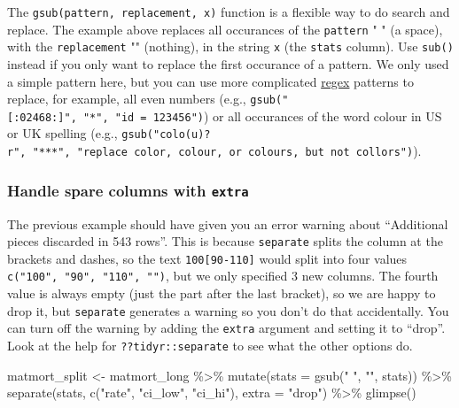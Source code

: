\documentclass[
  oneside]{book}
\newenvironment{Shaded}{\begin{snugshade}}{\end{snugshade}}
\newcommand{\AttributeTok}[1]{\textcolor[rgb]{0.77,0.63,0.00}{#1}}
\newcommand{\FunctionTok}[1]{\textcolor[rgb]{0.00,0.00,0.00}{#1}}
\newcommand{\NormalTok}[1]{#1}
\newcommand{\OtherTok}[1]{\textcolor[rgb]{0.56,0.35,0.01}{#1}}
\newcommand{\SpecialCharTok}[1]{\textcolor[rgb]{0.00,0.00,0.00}{#1}}
\newcommand{\StringTok}[1]{\textcolor[rgb]{0.31,0.60,0.02}{#1}}
\begin{document}
\begin{info}
The \texttt{gsub(pattern,\ replacement,\ x)} function is a
flexible way to do search and replace. The example above replaces all occurances of the \texttt{pattern} " " (a space), with the \texttt{replacement} "" (nothing), in the string \texttt{x} (the \texttt{stats} column). Use \texttt{sub()} instead if you only want to replace the first occurance of a pattern. We only used a simple pattern here, but you can use more complicated \href{https://stat.ethz.ch/R-manual/R-devel/library/base/html/regex.html}{regex} patterns to replace, for example, all even numbers (e.g., \texttt{gsub("{[}:02468:{]}",\ "*",\ "id\ =\ 123456")}) or all occurances of the word colour in US or UK spelling
(e.g., \texttt{gsub("colo(u)?r",\ "***",\ "replace\ color,\ colour,\ or\ colours,\ but\ not\ collors")}).

\end{info}

\hypertarget{extra}{%
\subsubsection{\texorpdfstring{Handle spare columns with \texttt{extra}}{Handle spare columns with extra}}\label{extra}}

\begin{warning}
The previous example should have given you an error warning about
``Additional pieces discarded in 543 rows''. This is because \texttt{separate} splits the column at the brackets and dashes, so the text \texttt{100{[}90-110{]}} would split into four values \texttt{c("100",\ "90",\ "110",\ "")}, but we only specified 3 new columns. The fourth value is always empty (just the part after the last bracket), so we are happy to drop it, but \texttt{separate} generates a warning so you don't do that accidentally. You can turn off the warning by adding the \texttt{extra} argument and setting it to ``drop''. Look at the help for \texttt{??tidyr::separate} to see what the other options do.

\end{warning}

\begin{Shaded}
\begin{Highlighting}[]
\NormalTok{matmort\_split }\OtherTok{\textless{}{-}}\NormalTok{ matmort\_long }\SpecialCharTok{\%\textgreater{}\%}
  \FunctionTok{mutate}\NormalTok{(}\AttributeTok{stats =} \FunctionTok{gsub}\NormalTok{(}\StringTok{" "}\NormalTok{, }\StringTok{""}\NormalTok{, stats)) }\SpecialCharTok{\%\textgreater{}\%}
  \FunctionTok{separate}\NormalTok{(stats, }\FunctionTok{c}\NormalTok{(}\StringTok{"rate"}\NormalTok{, }\StringTok{"ci\_low"}\NormalTok{, }\StringTok{"ci\_hi"}\NormalTok{), }\AttributeTok{extra =} \StringTok{"drop"}\NormalTok{) }\SpecialCharTok{\%\textgreater{}\%}
  \FunctionTok{glimpse}\NormalTok{()}
\end{Highlighting}
\end{Shaded}
\end{document}
